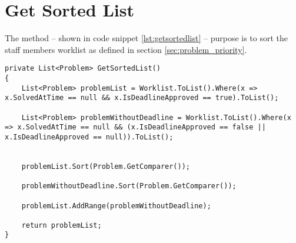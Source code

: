 \section{Get Sorted List}
\label{sec:getsortedlist}

The  method -- shown in code snippet \ref{lst:getsortedlist} -- purpose is to sort the staff members worklist as defined in section \ref{sec:problem_priority}. 



\begin{lstlisting}[style=sourceCode, caption=\myCaption{The ManageTagTimes method}, label=lst:getsortedlist]
private List<Problem> GetSortedList()
{
    List<Problem> problemList = Worklist.ToList().Where(x => x.SolvedAtTime == null && x.IsDeadlineApproved == true).ToList();

    List<Problem> problemWithoutDeadline = Worklist.ToList().Where(x => x.SolvedAtTime == null && (x.IsDeadlineApproved == false || x.IsDeadlineApproved == null)).ToList();


    problemList.Sort(Problem.GetComparer());

    problemWithoutDeadline.Sort(Problem.GetComparer());

    problemList.AddRange(problemWithoutDeadline);

    return problemList;
}
\end{lstlisting}